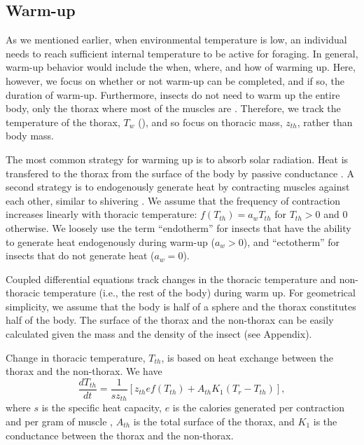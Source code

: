 \subsection*{Warm-up}

As we mentioned earlier, when environmental temperature is low, an individual needs to reach sufficient internal temperature to be active for foraging.
In general, warm-up behavior would include the when, where, and how of warming up.
Here, however, we focus on whether or not warm-up can be completed, and if so, the duration of warm-up.
Furthermore, insects do not need to warm up the entire body, only the thorax where most of the muscles are \citep{Kammer1974, Heinrich1975, Bartholomew1978, Verdu2012}.
Therefore, we track the temperature of the thorax, $T_w$ (), and so focus on thoracic mass, $z_{th}$, rather than body mass.

The most common strategy for warming up is to absorb solar radiation.
Heat is transfered to the thorax from the surface of the body by passive conductance \citep{Bakken1976}.
A second strategy is to endogenously generate heat by contracting muscles against each other, similar to shivering \citep[e.g.,][]{Kammer1974}.
We assume that the frequency of contraction increases linearly with thoracic temperature: $f(T_{th}) = a_w T_{th}$ for $T_{th} > 0$ and 0 otherwise.
We loosely use the term ``endotherm'' for insects that have the ability to generate heat endogenously during warm-up ($a_w > 0$), and ``ectotherm'' for insects that do not generate heat ($a_w = 0$).

Coupled differential equations  track changes in the thoracic temperature and non-thoracic temperature (i.e., the rest of the body) during warm up.
For geometrical simplicity, we assume that the body is half of a sphere and the thorax constitutes half of the body.
The surface of the thorax and the non-thorax can be easily calculated given the mass and the density of the insect (see Appendix).

Change in thoracic temperature, $T_{th}$, is based on heat exchange between the thorax and the non-thorax.
We have
\begin{equation} \label{eq:dTh}
	\frac{dT_{th}}{dt} = \frac{1}{s z_{th}} \left[ z_{th} e f(T_{th}) +  A_{th} K_1(T_r - T_{th}) \right],
\end{equation}
where $s$ is the specific heat capacity, $e$ is the calories generated per contraction and per gram of muscle \citep{Kammer1974}, $A_{th}$ is the total surface of the thorax, and $K_1$ is the conductance between the thorax and the non-thorax.

